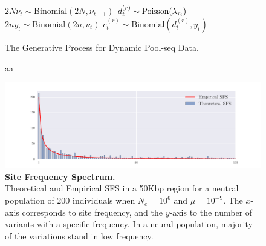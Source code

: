 \begin{figure}[H]
 \begin{algorithm}[H]
 	\DontPrintSemicolon
 	\SetAlgoNoLine
 	{
 		{
 			$2N\nu_t \sim \text{Binomial}({2N},{\nu_{t-1}})$\;
 			{
 				$d^{(r)}_{t} \sim \operatorname{Poisson}(\lambda_{\tau_i})$ \;
 				$2ny_t \sim \text{Binomial}({2n},{\nu_{t}})$\;  
 				$c^{(r)}_{t} \sim \text{Binomial}(d^{(r)}_{t},{y_{t}})$\; 
 			}
 		}
 	}
 	\caption{The Generative Process for Dynamic Pool-seq Data.} 
 \end{algorithm}
 \caption{aa}
  	\label{proc:arya}
\end{figure}	
\begin{figure}[H]
	\centering
	\includegraphics[trim=.01in 0.1in .01in 
	0.1in,clip,width=\textwidth]{sfs.pdf}
	\caption{{\bf Site Frequency Spectrum.}\\ Theoretical and
          Empirical SFS in a 50Kbp region for a neutral population of 200
          individuals when $N_e=10^6$ and $\mu=10^{-9}$. The $x$-axis 
          corresponds to site frequency, and
          the $y$-axis to the number of variants with a specific
          frequency. 
          In a neural population, majority of the variations stand in low 
          frequency.} \label{fig:sfs}
\end{figure}

